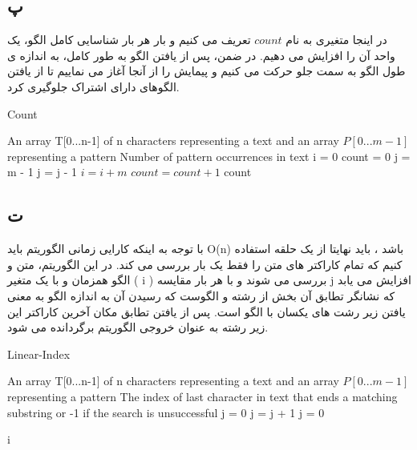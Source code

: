 \documentclass{article}
\begin{document}
\pagebreak
\subsection{پ}
در اینجا متغیری به نام 
$count$
تعریف می کنیم و بار هر بار شناسایی کامل الگو، یک واحد آن را افزایش می دهیم.
در ضمن، پس از یافتن الگو به طور کامل، به اندازه ی طول الگو به سمت جلو حرکت می کنیم و 
پیمایش را از آنجا آغاز می نماییم تا از یافتن الگوهای دارای اشتراک جلوگیری کرد.
\begin{latin}
    \begin{algorithm}
        \caption{Count}
        \begin{algorithmic}
            \Require An array T[0...n-1] of n characters representing a text
            and an array $P[0...m-1]$ representing a pattern
            \Ensure Number of pattern occurrences in text
            \State i = 0
            \State count = 0
                \State j = m - 1
                    \State j = j - 1
                \EndWhile
                    \State $ i = i + m$
                    \State $ count = count + 1$
                \EndIf
            \EndWhile
            \State \Return count
        \end{algorithmic}
    \end{algorithm}
\end{latin}

\subsection{ت‌}
با توجه به اینکه کارایی زمانی الگوریتم باید
O(n)
باشد ، باید نهایتا از یک حلقه استفاده کنیم که تمام کاراکتر های متن را فقط یک بار بررسی می کند.
در این الگوریتم، متن و الگو همزمان و با یک متغیر ( i )
بررسی می شوند و با هر بار مقایسه j افزایش می یابد
که نشانگر تطابق آن بخش از رشته و الگوست که رسیدن آن به اندازه الگو به معنی یافتن زیر رشت های یکسان با الگو است.
 پس از یافتن تطابق مکان آخرین کاراکتر این زیر رشته به عنوان خروجی الگوریتم برگردانده می شود.
\begin{latin}
    \begin{algorithm}
        \caption[short]{Linear-Index}
        \begin{algorithmic}
            \Require An array T[0...n-1] of n characters representing a text
            and an array $P[0...m-1]$ representing a pattern
            \Ensure The index of last character in text that ends a matching substring or -1 if the search is unsuccessful
            \State j = 0
                    \State j = j + 1
                \Else
                    \State j = 0
                \EndIf

                    \State \Return i
                \EndIf
            \EndFor
            \State {}
        \end{algorithmic}
    \end{algorithm}
\end{latin}
\end{document}
